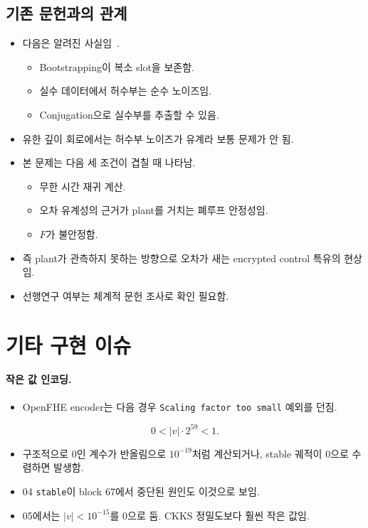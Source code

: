 \documentclass[11pt,a4paper]{article}
\begin{document}
\subsection{기존 문헌과의 관계}
\begin{itemize}
\item 다음은 알려진 사실임~\cite{openfhe-nf,kimsong}.
  \begin{itemize}
  \item Bootstrapping이 복소 slot을 보존함.
  \item 실수 데이터에서 허수부는 순수 노이즈임.
  \item Conjugation으로 실수부를 추출할 수 있음.
  \end{itemize}
\item 유한 깊이 회로에서는 허수부 노이즈가 유계라 보통 문제가 안 됨.
\item 본 문제는 다음 세 조건이 겹칠 때 나타남.
  \begin{itemize}
  \item 무한 시간 재귀 계산.
  \item 오차 유계성의 근거가 plant를 거치는 폐루프 안정성임.
  \item $F$가 불안정함.
  \end{itemize}
\item 즉 plant가 관측하지 못하는 방향으로 오차가 새는 encrypted control 특유의 현상임.
\item 선행연구 여부는 체계적 문헌 조사로 확인 필요함.
\end{itemize}

\section{기타 구현 이슈}
\paragraph{작은 값 인코딩.}
\begin{itemize}
\item OpenFHE encoder는 다음 경우 \texttt{Scaling factor too small} 예외를 던짐.
\end{itemize}
\begin{equation}
0<|v|\cdot2^{59}<1 .
\end{equation}
\begin{itemize}
\item 구조적으로 0인 계수가 반올림으로 $10^{-19}$처럼 계산되거나, stable 궤적이 0으로 수렴하면 발생함.
\item 04 \texttt{stable}이 block 67에서 중단된 원인도 이것으로 보임.
\item 05에서는 $|v|<10^{-15}$를 0으로 둠. CKKS 정밀도보다 훨씬 작은 값임.
\end{itemize}
\end{document}
